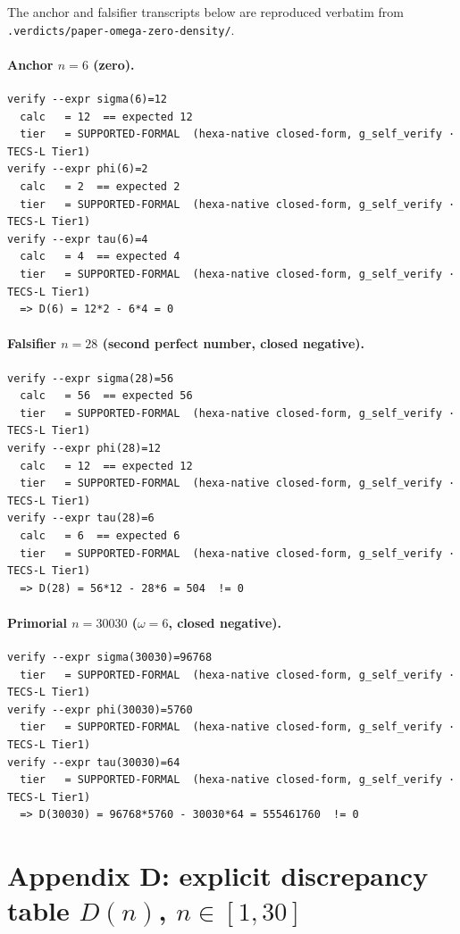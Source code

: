 \documentclass[11pt,a4paper]{article}
\theoremstyle{plain}
\theoremstyle{definition}
\begin{document}
The anchor and falsifier transcripts below are reproduced verbatim from
\texttt{.verdicts/paper-omega-zero-density/}.

\paragraph{Anchor $n=6$ (zero).}
\begin{verbatim}
verify --expr sigma(6)=12
  calc   = 12  == expected 12
  tier   = SUPPORTED-FORMAL  (hexa-native closed-form, g_self_verify · TECS-L Tier1)
verify --expr phi(6)=2
  calc   = 2  == expected 2
  tier   = SUPPORTED-FORMAL  (hexa-native closed-form, g_self_verify · TECS-L Tier1)
verify --expr tau(6)=4
  calc   = 4  == expected 4
  tier   = SUPPORTED-FORMAL  (hexa-native closed-form, g_self_verify · TECS-L Tier1)
  => D(6) = 12*2 - 6*4 = 0
\end{verbatim}

\paragraph{Falsifier $n=28$ (second perfect number, closed negative).}
\begin{verbatim}
verify --expr sigma(28)=56
  calc   = 56  == expected 56
  tier   = SUPPORTED-FORMAL  (hexa-native closed-form, g_self_verify · TECS-L Tier1)
verify --expr phi(28)=12
  calc   = 12  == expected 12
  tier   = SUPPORTED-FORMAL  (hexa-native closed-form, g_self_verify · TECS-L Tier1)
verify --expr tau(28)=6
  calc   = 6  == expected 6
  tier   = SUPPORTED-FORMAL  (hexa-native closed-form, g_self_verify · TECS-L Tier1)
  => D(28) = 56*12 - 28*6 = 504  != 0
\end{verbatim}

\paragraph{Primorial $n=30030$ ($\omega=6$, closed negative).}
\begin{verbatim}
verify --expr sigma(30030)=96768
  tier   = SUPPORTED-FORMAL  (hexa-native closed-form, g_self_verify · TECS-L Tier1)
verify --expr phi(30030)=5760
  tier   = SUPPORTED-FORMAL  (hexa-native closed-form, g_self_verify · TECS-L Tier1)
verify --expr tau(30030)=64
  tier   = SUPPORTED-FORMAL  (hexa-native closed-form, g_self_verify · TECS-L Tier1)
  => D(30030) = 96768*5760 - 30030*64 = 555461760  != 0
\end{verbatim}

\section{Appendix D: explicit discrepancy table $D(n)$, $n\in[1,30]$}
\label{sec:dtable}
\end{document}
